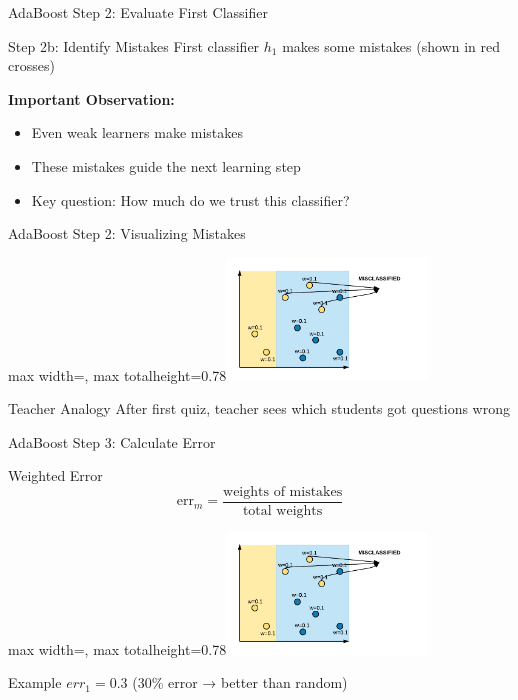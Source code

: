 \documentclass[10pt]{beamer}
\newcommand{\fitpic}[1]{\begin{adjustbox}{max width=\linewidth, max totalheight=0.78\textheight}#1\end{adjustbox}}
\begin{document}
\begin{frame}{AdaBoost Step 2: Evaluate First Classifier}
\begin{alertbox}{Step 2b: Identify Mistakes}
First classifier $h_1$ makes some mistakes (shown in red crosses)
\end{alertbox}

\begin{keypointsbox}
\textbf{Important Observation:}
\begin{itemize}
\item Even weak learners make mistakes
\item These mistakes guide the next learning step
\item Key question: How much do we trust this classifier?
\end{itemize}
\end{keypointsbox}
\end{frame}

\begin{frame}{AdaBoost Step 2: Visualizing Mistakes}
  \vspace{0.3cm}
  \centering
  \fitpic{\includegraphics[width = 0.4\textwidth]{../assets/ensemble/diagrams/ada_iter1_misclassify}}

\begin{examplebox}{Teacher Analogy}
After first quiz, teacher sees which students got questions wrong
\end{examplebox}
\end{frame}

\begin{frame}{AdaBoost Step 3: Calculate Error}
\begin{definitionbox}{Weighted Error}
$$\text{err}_m = \frac{\text{weights of mistakes}}{\text{total weights}}$$
\end{definitionbox}

\begin{center}
\fitpic{\includegraphics[width = 0.4\textwidth]{../assets/ensemble/diagrams/ada_iter1_misclassify}}
\end{center}

\begin{examplebox}{Example}
$err_1 = 0.3$ (30\% error → better than random)
\end{examplebox}
\end{frame}
\end{document}
